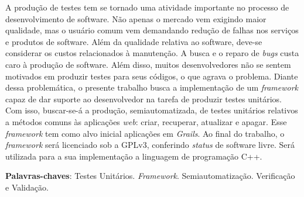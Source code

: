 \begin{resumo}
A produção de testes tem se tornado uma atividade importante no processo de desenvolvimento de software. Não apenas o mercado vem exigindo maior qualidade, mas o usuário comum vem demandando redução de falhas nos serviços e produtos de software. Além da qualidade relativa ao software, deve-se considerar os custos relacionados à manutenção. A busca e o reparo de \textit{bugs} custa caro à produção de software. Além disso, muitos desenvolvedores não se sentem motivados em produzir testes para seus códigos, o que agrava o problema. Diante dessa problemática, o presente trabalho busca a implementação de um \textit{framework} capaz de dar suporte ao desenvolvedor na tarefa de produzir testes unitários. Com isso, buscar-se-á a produção, semiautomatizada, de testes unitários relativos a métodos comuns às aplicações \textit{web}: criar, recuperar, atualizar e apagar. Esse \textit{framework} tem como alvo inicial aplicações em \textit{Grails}. Ao final do trabalho, o \textit{framework} será licenciado sob a GPLv3, conferindo \textit{status} de software livre. Será utilizada para a sua implementação a linguagem de programação C++.
\vspace{\onelineskip}
    
\noindent
\textbf{Palavras-chaves}: Testes Unitários. \textit{Framework}. Semiautomatização. Verificação e Validação.
\end{resumo}
